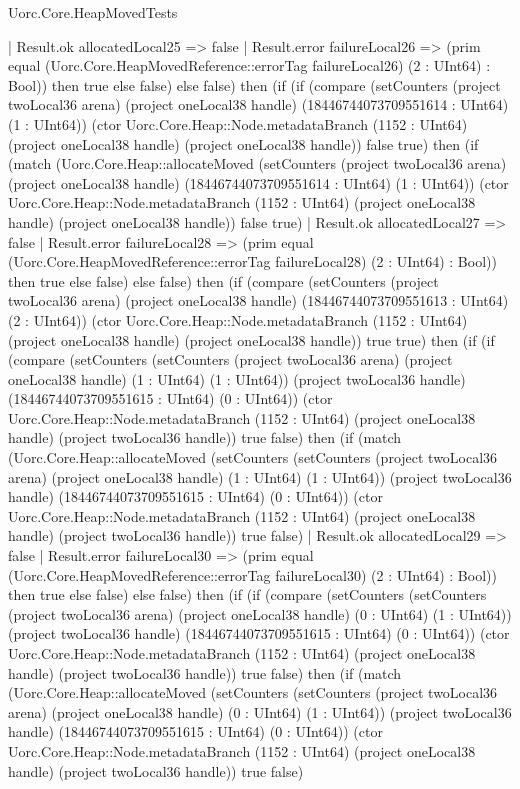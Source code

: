 \begin{lexlean}{Uorc.Core.HeapMovedTests}
\begin{semanticmodule}
{        | Result.ok allocatedLocal25 => false
        | Result.error failureLocal26 => (prim equal (Uorc.Core.HeapMovedReference::errorTag failureLocal26) (2 : UInt64) : Bool)) then true else false) else false) then (if (if (compare (setCounters (project twoLocal36 arena) (project oneLocal38 handle) (18446744073709551614 : UInt64) (1 : UInt64)) (ctor Uorc.Core.Heap::Node.metadataBranch (1152 : UInt64) (project oneLocal38 handle) (project oneLocal38 handle)) false true) then (if (match (Uorc.Core.Heap::allocateMoved (setCounters (project twoLocal36 arena) (project oneLocal38 handle) (18446744073709551614 : UInt64) (1 : UInt64)) (ctor Uorc.Core.Heap::Node.metadataBranch (1152 : UInt64) (project oneLocal38 handle) (project oneLocal38 handle)) false true)
        | Result.ok allocatedLocal27 => false
        | Result.error failureLocal28 => (prim equal (Uorc.Core.HeapMovedReference::errorTag failureLocal28) (2 : UInt64) : Bool)) then true else false) else false) then (if (compare (setCounters (project twoLocal36 arena) (project oneLocal38 handle) (18446744073709551613 : UInt64) (2 : UInt64)) (ctor Uorc.Core.Heap::Node.metadataBranch (1152 : UInt64) (project oneLocal38 handle) (project oneLocal38 handle)) true true) then (if (if (compare (setCounters (setCounters (project twoLocal36 arena) (project oneLocal38 handle) (1 : UInt64) (1 : UInt64)) (project twoLocal36 handle) (18446744073709551615 : UInt64) (0 : UInt64)) (ctor Uorc.Core.Heap::Node.metadataBranch (1152 : UInt64) (project oneLocal38 handle) (project twoLocal36 handle)) true false) then (if (match (Uorc.Core.Heap::allocateMoved (setCounters (setCounters (project twoLocal36 arena) (project oneLocal38 handle) (1 : UInt64) (1 : UInt64)) (project twoLocal36 handle) (18446744073709551615 : UInt64) (0 : UInt64)) (ctor Uorc.Core.Heap::Node.metadataBranch (1152 : UInt64) (project oneLocal38 handle) (project twoLocal36 handle)) true false)
        | Result.ok allocatedLocal29 => false
        | Result.error failureLocal30 => (prim equal (Uorc.Core.HeapMovedReference::errorTag failureLocal30) (2 : UInt64) : Bool)) then true else false) else false) then (if (if (compare (setCounters (setCounters (project twoLocal36 arena) (project oneLocal38 handle) (0 : UInt64) (1 : UInt64)) (project twoLocal36 handle) (18446744073709551615 : UInt64) (0 : UInt64)) (ctor Uorc.Core.Heap::Node.metadataBranch (1152 : UInt64) (project oneLocal38 handle) (project twoLocal36 handle)) true false) then (if (match (Uorc.Core.Heap::allocateMoved (setCounters (setCounters (project twoLocal36 arena) (project oneLocal38 handle) (0 : UInt64) (1 : UInt64)) (project twoLocal36 handle) (18446744073709551615 : UInt64) (0 : UInt64)) (ctor Uorc.Core.Heap::Node.metadataBranch (1152 : UInt64) (project oneLocal38 handle) (project twoLocal36 handle)) true false)
}
\end{semanticmodule}
\end{lexlean}
